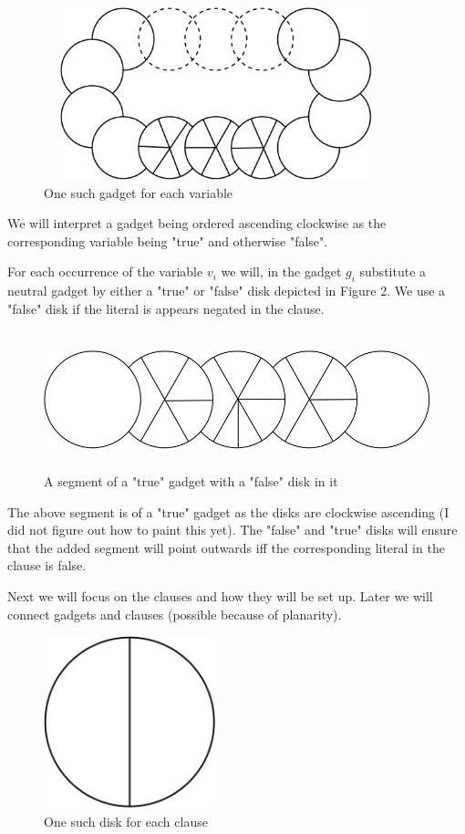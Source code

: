 \documentclass[a4paper,11pt]{article}
\begin{document}
\begin{figure}[h]
\centering
\includegraphics[width=10cm, height=5cm]{assets/np-hardness/gadget.png}
\caption{One such gadget for each variable}
\end{figure}

We will interpret a gadget being ordered ascending clockwise as the corresponding variable being "true" and otherwise "false".

For each occurrence of the variable $v_i$ we will, in the gadget $g_i$ substitute a neutral gadget by either a "true" or "false" disk depicted in Figure 2. We use a "false" disk if the literal is appears negated in the clause.

\begin{figure}[h]
\centering
\includegraphics[width=15cm, height=4cm]{assets/np-hardness/negative.png}
\caption{A segment of a "true" gadget with a "false" disk in it}
\end{figure}

The above segment is of a "true" gadget as the disks are clockwise ascending (I did not figure out how to paint this yet). The "false" and "true" disks will ensure that the added segment will point outwards iff the corresponding literal in the clause is false.

Next we will focus on the clauses and how they will be set up. Later we will connect gadgets and clauses (possible because of planarity).

\begin{figure}[h]
\centering
\includegraphics[width=5cm, height=5cm]{assets/np-hardness/clause.png}
\caption{One such disk for each clause}
\end{figure}
\end{document}
